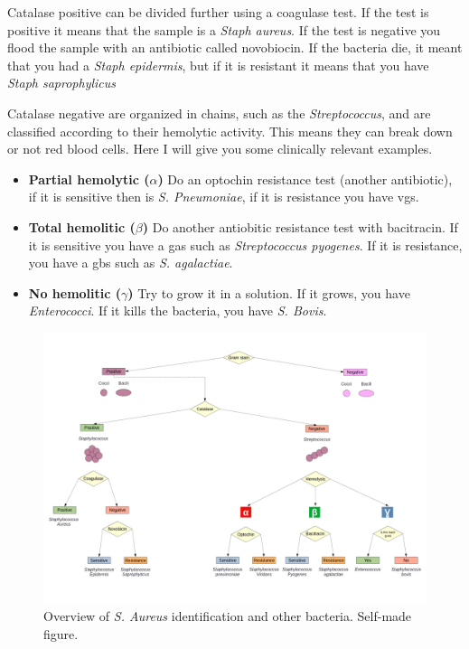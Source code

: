 Catalase positive can be divided further using a coagulase test. If the test is positive it means that the sample is a \textit{Staph aureus}. If the test is negative you flood the sample with an antibiotic called novobiocin. If the bacteria die, it meant that you had a \textit{Staph epidermis}, but if it is resistant it means that you have \textit{Staph saprophylicus}

Catalase negative are organized in chains, such as the \textit{Streptococcus}, and are classified according to their hemolytic activity. This means they can break down or not red blood cells. Here I will give you some clinically relevant examples.

\begin{itemize}

    \item \textbf{Partial hemolytic ($\alpha$)} Do an optochin resistance test (another antibiotic), if it is sensitive then is \textit{S. Pneumoniae}, if it is resistance you have \gls{vgs}.
    
    \item \textbf{Total hemolitic ($\beta$)} Do another antiobitic resistance test with bacitracin. If it is sensitive you have a \gls{gas} such as \textit{Streptococcus pyogenes}. If it is resistance, you have a \gls{gbs} such as \textit{S. agalactiae}.
    
    \item \textbf{No hemolitic ($\gamma$)} Try to grow it in a  solution. If it grows, you have \textit{Enterococci}. If it kills the bacteria, you have \textit{S. Bovis}.
    
\end{itemize}

    \begin{figure}[h!]
        \centering
            \includegraphics[width=0.9\linewidth]{figures/Staph/Identification.png}
            \caption{Overview of \textit{S. Aureus} identification and other bacteria. Self-made figure.}
            \label{figure:identification}
    \end{figure}

